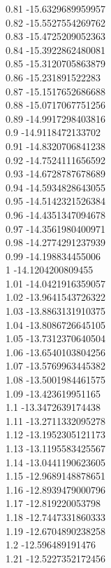 {0.81	-15.6329689959957\\
0.82	-15.5527554269762\\
0.83	-15.4725209052363\\
0.84	-15.3922862480081\\
0.85	-15.3120705863879\\
0.86	-15.231891522283\\
0.87	-15.1517652686688\\
0.88	-15.0717067751256\\
0.89	-14.9917298403816\\
0.9	-14.9118472133702\\
0.91	-14.8320706841238\\
0.92	-14.7524111656592\\
0.93	-14.6728787678689\\
0.94	-14.5934828643055\\
0.95	-14.5142321526384\\
0.96	-14.4351347094678\\
0.97	-14.3561980400971\\
0.98	-14.2774291237939\\
0.99	-14.198834455006\\
1	-14.1204200809455\\
1.01	-14.0421916359057\\
1.02	-13.9641543726322\\
1.03	-13.8863131910375\\
1.04	-13.8086726645105\\
1.05	-13.7312370640504\\
1.06	-13.6540103804256\\
1.07	-13.5769963445382\\
1.08	-13.5001984461575\\
1.09	-13.423619951165\\
1.1	-13.3472639174438\\
1.11	-13.2711332095278\\
1.12	-13.1952305121173\\
1.13	-13.1195583425567\\
1.14	-13.0441190623605\\
1.15	-12.9689148878651\\
1.16	-12.8939479000796\\
1.17	-12.819220053798\\
1.18	-12.7447331860333\\
1.19	-12.6704890238258\\
1.2	-12.596489191476\\
1.21	-12.5227352172456\\
}
